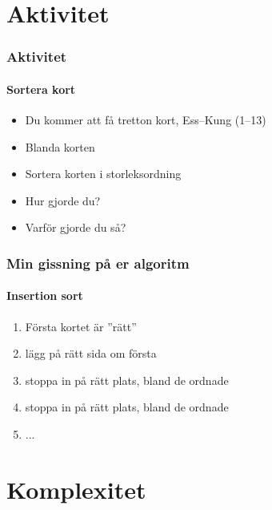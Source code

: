 \documentclass[aspectratio=169]{beamer}
\begin{document}
\section{Aktivitet}

\begin{frame}
	\frametitle{Aktivitet}
	\framesubtitle{Sortera kort}
	
	\begin{itemize}
		\item Du kommer att få tretton kort, Ess--Kung (1--13)
		\item Blanda korten
		\item Sortera korten i storleksordning
		\item Hur gjorde du?
		\item Varför gjorde du så?
	\end{itemize}
	
\end{frame}

\begin{frame}
	\frametitle{Min gissning på er algoritm}
	\framesubtitle{Insertion sort}
	
	\begin{enumerate}
		\item Första kortet är ''rätt''
		\item lägg på rätt sida om första
		\item stoppa in på rätt plats, bland de ordnade
		\item stoppa in på rätt plats, bland de ordnade
		\item ...
	\end{enumerate}	
	
\end{frame}

\section{Komplexitet}
\end{document}
